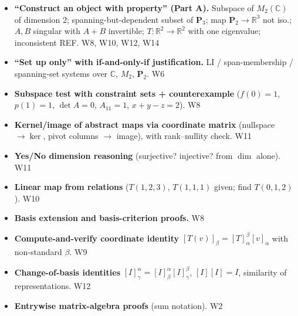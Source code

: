\begin{itemize}[leftmargin=1.2em,itemsep=0pt,topsep=1pt]
\item \textbf{``Construct an object with property'' (Part A).} Subspace of $M_2(\mathbb C)$ of dimension 2; spanning-but-dependent subset of $\mathbf P_3$; map $\mathbf P_2\to\mathbb R^3$ not iso.; $A,B$ singular with $A+B$ invertible; $T:\mathbb R^2\to\mathbb R^2$ with one eigenvalue; inconsistent REF. \hfill W8, W10, W12, W14
\item \textbf{``Set up only'' with if-and-only-if justification.} LI / span-membership / spanning-set systems over $\mathbb C$, $M_2$, $\mathbf P_2$. \hfill W6
\item \textbf{Subspace test with constraint sets + counterexample} ($f(0)=1$, $p(1)=1$, $\det A=0$, $A_{11}=1$, $x+y-z=2$). \hfill W8
\item \textbf{Kernel/image of abstract maps via coordinate matrix} (nullspace $\to\ker$, pivot columns $\to$ image), with rank--nullity check. \hfill W11
\item \textbf{Yes/No dimension reasoning} (surjective? injective? from $\dim$ alone). \hfill W11
\item \textbf{Linear map from relations} ($T(1,2,3)$, $T(1,1,1)$ given; find $T(0,1,2)$). \hfill W10
\item \textbf{Basis extension and basis-criterion proofs.} \hfill W8
\item \textbf{Compute-and-verify coordinate identity} $[T(v)]_\beta=[T]_\alpha^\beta[v]_\alpha$ with non-standard $\beta$. \hfill W9
\item \textbf{Change-of-basis identities} $[I]^\alpha_\gamma=[I]^\alpha_\beta[I]^\beta_\gamma$, $[I][I]=I$, similarity of representations. \hfill W12
\item \textbf{Entrywise matrix-algebra proofs} (sum notation). \hfill W2
\end{itemize}
